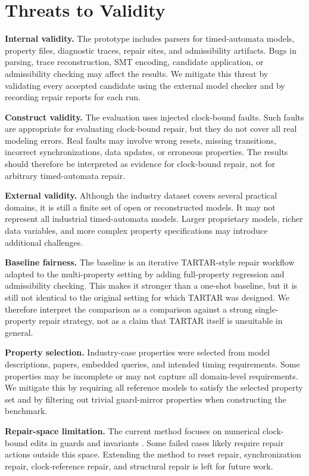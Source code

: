 \section{Threats to Validity}
\label{sec:threats}

\textbf{Internal validity.} The prototype includes parsers for
timed-automata models, property files, diagnostic traces, repair sites,
and admissibility artifacts. Bugs in parsing, trace reconstruction, SMT
encoding, candidate application, or admissibility checking may affect
the results. We mitigate this threat by validating every accepted
candidate using the external model checker and by recording repair
reports for each run.

\textbf{Construct validity.} The evaluation uses injected clock-bound
faults. Such faults are appropriate for evaluating clock-bound repair,
but they do not cover all real modeling errors. Real faults may involve
wrong resets, missing transitions, incorrect synchronizations, data
updates, or erroneous properties. The results should therefore be
interpreted as evidence for clock-bound repair, not for arbitrary
timed-automata repair.

\textbf{External validity.} Although the industry dataset covers several
practical domains, it is still a finite set of open or reconstructed
models. It may not represent all industrial timed-automata models.
Larger proprietary models, richer data variables, and more complex
property specifications may introduce additional challenges.

\textbf{Baseline fairness.} The baseline is an iterative TARTAR-style
repair workflow adapted to the multi-property setting by adding
full-property regression and admissibility checking. This makes it
stronger than a one-shot baseline, but it is still not identical to the
original setting for which TARTAR was designed. We therefore interpret
the comparison as a comparison against a strong single-property repair
strategy, not as a claim that TARTAR itself is unsuitable in general.

\textbf{Property selection.} Industry-case properties were selected from
model descriptions, papers, embedded queries, and intended timing
requirements. Some properties may be incomplete or may not capture all
domain-level requirements. We mitigate this by requiring all reference
models to satisfy the selected property set and by filtering out trivial
guard-mirror properties when constructing the benchmark.

\textbf{Repair-space limitation.} The current method focuses on
numerical clock-bound edits in guards and invariants
\cite{leue2019clock}. Some failed cases likely require repair actions
outside this space. Extending the method to reset repair,
synchronization repair, clock-reference repair, and structural repair is
left for future work.
